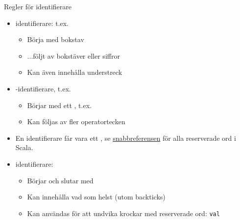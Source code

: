 \begin{Slide}{Regler för identifierare}
\begin{itemize}
\item {} identifierare: t.ex. 
\begin{itemize}
\item Börja med bokstav
\item ...följt av bokstäver eller siffror
\item Kan även innehålla understreck
\end{itemize}

\item {}-identifierare, t.ex. \code{+:}
\begin{itemize}
\item Börjar med ett , t.ex. 
\item Kan följas av fler operatortecken
\end{itemize}


\item En identifierare får  vara ett , se \href{https://fileadmin.cs.lth.se/pgk/quickref.pdf}{snabbreferensen} för alla reserverade ord i Scala.

\item {} identifierare: 
\begin{itemize}
\item Börjar och slutar med   
\item Kan innehålla vad som helst (utom backticks)
\item Kan användas för att undvika krockar med reserverade ord: \texttt{val}
\end{itemize}

\end{itemize}
\end{Slide}


